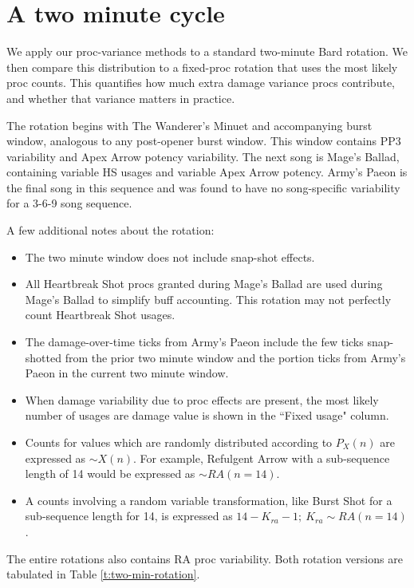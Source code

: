 \section{A two minute cycle}

We apply our proc-variance methods to a standard two-minute Bard rotation. We then compare this distribution to a fixed-proc rotation that uses the most likely proc counts. This quantifies how much extra damage variance procs contribute, and whether that variance matters in practice.

The rotation begins with The Wanderer's Minuet and accompanying burst window, analogous to any post-opener burst window. This window contains PP3 variability and Apex Arrow potency variability. The next song is Mage's Ballad, containing variable HS usages and variable Apex Arrow potency. Army's Paeon is the final song in this sequence and was found to have no song-specific variability for a 3-6-9 song sequence.

A few additional notes about the rotation:

\begin{itemize}
  \item The two minute window does not include snap-shot effects.
  \item All Heartbreak Shot procs granted during Mage's Ballad are used during Mage's Ballad to simplify buff accounting. This rotation may not perfectly count Heartbreak Shot usages.
  \item The damage-over-time ticks from Army's Paeon include the few ticks snap-shotted from the prior two minute window and the portion ticks from Army's Paeon in the current two minute window.
  \item When damage variability due to proc effects are present, the most likely number of usages are damage value is shown in the ``Fixed usage" column.
  \item Counts for values which are randomly distributed according to $P_X(n)$ are expressed as $\sim X(n)$. For example, Refulgent Arrow with a sub-sequence length of 14 would be expressed as $\sim RA(n=14)$.
  \item A counts involving a random variable transformation, like Burst Shot for a sub-sequence length for 14, is expressed as $14 - K_{ra} - 1; \: K_{ra} \sim RA(n=14)$.
\end{itemize}

The entire rotations also contains RA proc variability. Both rotation versions are tabulated in Table \ref{t:two-min-rotation}. 

